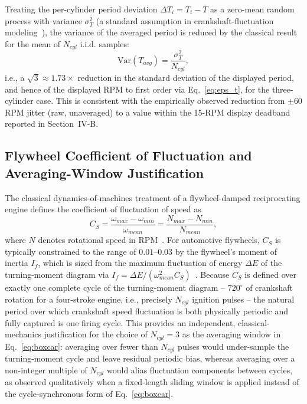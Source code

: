 \documentclass[journal, twocolumn]{IEEEtran}
\begin{document}
Treating the per-cylinder period deviation $\Delta T_i = T_i - \bar{T}$ as a zero-mean random process with variance $\sigma_T^2$ (a standard assumption in crankshaft-fluctuation modeling~\cite{rizzoni1989}), the variance of the averaged period is reduced by the classical result for the mean of $N_{cyl}$ i.i.d. samples:
\begin{equation}
\text{Var}(T_{avg}) = \frac{\sigma_T^2}{N_{cyl}},
\label{eq:var_reduction}
\end{equation}
i.e., a $\sqrt{3}\approx1.73\times$ reduction in the standard deviation of the displayed period, and hence of the displayed RPM to first order via Eq.~\eqref{eq:eps_t}, for the three-cylinder case. This is consistent with the empirically observed reduction from $\pm60$ RPM jitter (raw, unaveraged) to a value within the 15-RPM display deadband reported in Section~IV-B.

\subsection{Flywheel Coefficient of Fluctuation and Averaging-Window Justification}
The classical dynamics-of-machines treatment of a flywheel-damped reciprocating engine defines the coefficient of fluctuation of speed as
\begin{equation}
C_S = \frac{\omega_{max}-\omega_{min}}{\omega_{mean}} = \frac{N_{max}-N_{min}}{N_{mean}},
\label{eq:cs}
\end{equation}
where $N$ denotes rotational speed in RPM~\cite{khurmi_tom}. For automotive flywheels, $C_S$ is typically constrained to the range of $0.01$--$0.03$ by the flywheel's moment of inertia $I_f$, which is sized from the maximum fluctuation of energy $\Delta E$ of the turning-moment diagram via $I_f = \Delta E/(\omega_{mean}^2 C_S)$~\cite{khurmi_tom,lomakin2018}. Because $C_S$ is defined over exactly one complete cycle of the turning-moment diagram -- $720^\circ$ of crankshaft rotation for a four-stroke engine, i.e., precisely $N_{cyl}$ ignition pulses -- the natural period over which crankshaft speed fluctuation is both physically periodic and fully captured is one firing cycle. This provides an independent, classical-mechanics justification for the choice of $N_{cyl}=3$ as the averaging window in Eq.~\eqref{eq:boxcar}: averaging over fewer than $N_{cyl}$ pulses would under-sample the turning-moment cycle and leave residual periodic bias, whereas averaging over a non-integer multiple of $N_{cyl}$ would alias fluctuation components between cycles, as observed qualitatively when a fixed-length sliding window is applied instead of the cycle-synchronous form of Eq.~\eqref{eq:boxcar}.
\end{document}
